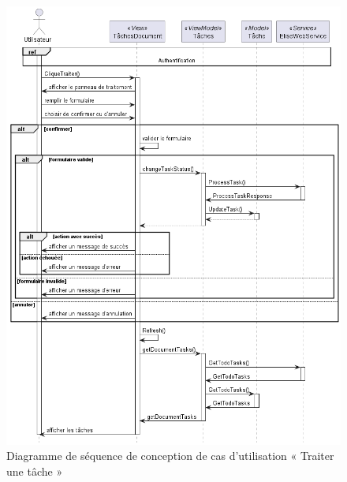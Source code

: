 \begin{figure}[H]
  \centering
  \includegraphics[width=1\textwidth]{out/diagrams/documents/sequence_traiter_task/sequence_traiter_task}
  \caption{Diagramme de séquence de conception de cas d'utilisation « Traiter une tâche »}
  \label{fig:sequence_conception_traiterTask}
\end{figure}
